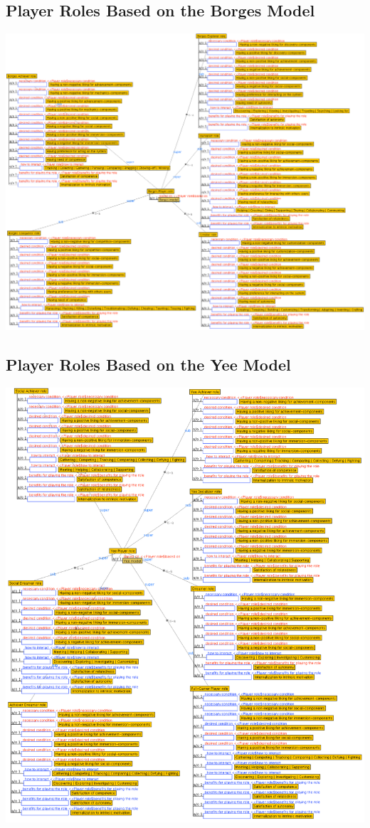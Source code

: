 \newpage
\subsection{Player Roles Based on the Borges Model}
\label{sec:player-roles-based-borges}
\includegraphics[width=1\textwidth]{images/appendix/player-roles-based-borges.png}

\newpage
\subsection{Player Roles Based on the Yee Model}
\label{sec:player-roles-based-yee}
\includegraphics[width=1\textwidth]{images/appendix/player-roles-based-yee.png}

